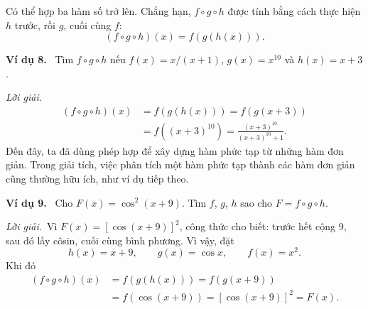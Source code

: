 \documentclass[12pt,a4paper]{article}
\newcommand{\ex}[1]{\par\medskip\noindent\textbf{Ví dụ #1.}\ }
\newcommand{\sol}{\par\noindent\textit{Lời giải.}\ }
\begin{document}
Có thể hợp ba hàm số trở lên. Chẳng hạn, $f\circ g\circ h$ được tính bằng cách thực hiện $h$ trước, rồi $g$, cuối cùng $f$:
\[(f\circ g\circ h)(x)=f(g(h(x))).\]

\ex{8} Tìm $f\circ g\circ h$ nếu $f(x)=x/(x+1)$, $g(x)=x^{10}$ và $h(x)=x+3$.
\sol
\begin{align*}
(f\circ g\circ h)(x)&=f(g(h(x)))=f(g(x+3))\\
&=f((x+3)^{10})=\frac{(x+3)^{10}}{(x+3)^{10}+1}.
\end{align*}
Đến đây, ta đã dùng phép hợp để xây dựng hàm phức tạp từ những hàm đơn giản. Trong giải tích, việc phân tích một hàm phức tạp thành các hàm đơn giản cũng thường hữu ích, như ví dụ tiếp theo.

\ex{9} Cho $F(x)=\cos^2(x+9)$. Tìm $f$, $g$, $h$ sao cho $F=f\circ g\circ h$.
\sol Vì $F(x)=[\cos(x+9)]^2$, công thức cho biết: trước hết cộng 9, sau đó lấy côsin, cuối cùng bình phương. Vì vậy, đặt
\[h(x)=x+9,\qquad g(x)=\cos x,\qquad f(x)=x^2.\]
Khi đó
\begin{align*}
(f\circ g\circ h)(x)&=f(g(h(x)))=f(g(x+9))\\
&=f(\cos(x+9))=[\cos(x+9)]^2=F(x).
\end{align*}

\clearpage
\end{document}
